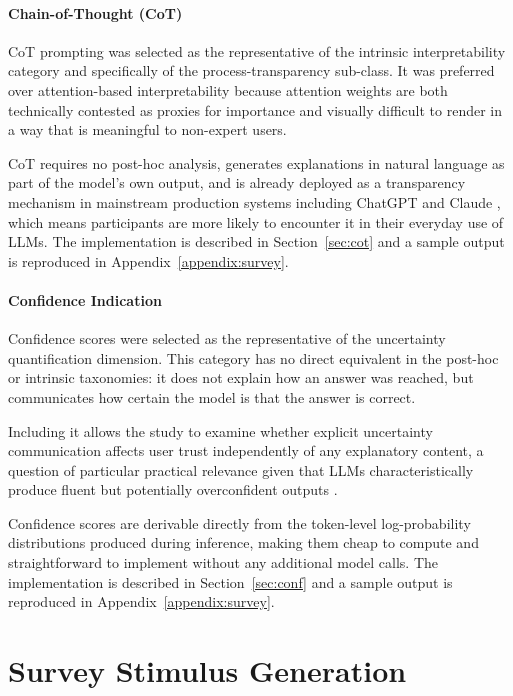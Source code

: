 \paragraph{Chain-of-Thought (CoT)}
CoT prompting was selected as the representative of the intrinsic interpretability category and specifically of the process-transparency sub-class. It was preferred over attention-based interpretability because attention weights are both technically contested as proxies for importance and visually difficult to render in a way that is meaningful to non-expert users. 

CoT requires no post-hoc analysis, generates explanations in natural language as part of the model's own output, and is already deployed as a transparency mechanism in mainstream production systems including ChatGPT \cite{guan_monitoring_2025} and Claude \cite{lindsey_biology_nodate}, which means participants are more likely to encounter it in their everyday use of LLMs. The implementation is described in Section~\ref{sec:cot} and a sample output is reproduced in Appendix~\ref{appendix:survey}.

\paragraph{Confidence Indication}
Confidence scores were selected as the representative of the uncertainty quantification dimension. This category has no direct equivalent in the post-hoc or intrinsic taxonomies: it does not explain how an answer was reached, but communicates how certain the model is that the answer is correct. 

Including it allows the study to examine whether explicit uncertainty communication affects user trust independently of any explanatory content, a question of particular practical relevance given that LLMs characteristically produce fluent but potentially overconfident outputs \cite{tao_when_2024}. 

Confidence scores are derivable directly from the token-level log-probability distributions produced during inference, making them cheap to compute and straightforward to implement without any additional model calls. The implementation is described in Section~\ref{sec:conf} and a sample output is reproduced in Appendix~\ref{appendix:survey}.

\section{Survey Stimulus Generation}
\label{sec:stimulusGeneration}

